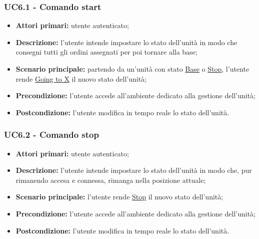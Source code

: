         \subsubsection{UC6.1 - Comando start}
        \begin{itemize}
            \item \textbf{Attori primari:} utente autenticato;
            \item \textbf{Descrizione:} l'utente intende impostare lo stato dell'unità in modo che consegni tutti gli ordini assegnati per poi tornare alla base;
            \item \textbf{Scenario principale:} partendo da un'unità con stato \underline{Base} o \underline{Stop}, l'utente rende \underline{Going to X} il nuovo stato dell'unità;
            \item \textbf{Precondizione:} l'utente accede all'ambiente dedicato alla gestione dell'unità;
            \item \textbf{Postcondizione:} l'utente modifica in tempo reale lo stato dell'unità.
        \end{itemize}

        \subsubsection{UC6.2 - Comando stop}
        \begin{itemize}
            \item \textbf{Attori primari:} utente autenticato;
            \item \textbf{Descrizione:} l'utente intende impostare lo stato dell'unità in modo che, pur rimanendo accesa e connessa, rimanga nella posizione attuale;
            \item \textbf{Scenario principale:} l'utente rende \underline{Stop} il nuovo stato dell'unità;
            \item \textbf{Precondizione:} l'utente accede all'ambiente dedicato alla gestione dell'unità;
            \item \textbf{Postcondizione:} l'utente modifica in tempo reale lo stato dell'unità.
        \end{itemize}

